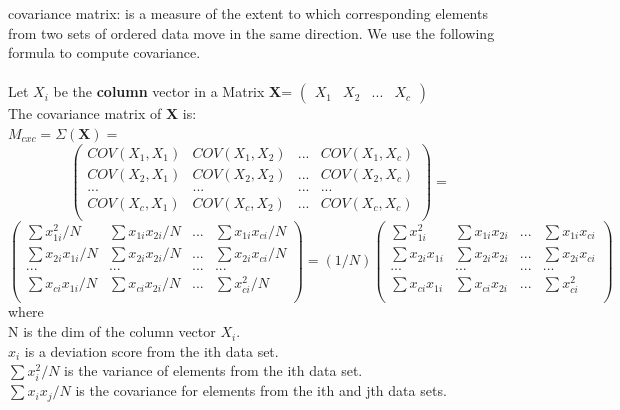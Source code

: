 \documentclass[a4paper,12pt]{article}
\begin{document}
\begin{compactitem}
\item covariance matrix: is a measure of the extent to which corresponding elements from two sets
of ordered data move in the same direction. We use the following formula to compute covariance.
\cite{wiki-covariance}\cite{STAT-covariance}\\
\\Let $X_i$ be the \textbf{column} vector in a Matrix \textbf{X}=
$\begin{pmatrix} X_1 & X_2 &... & X_c \end{pmatrix}$\\
The covariance matrix of \textbf{X} is:\\
$M_{cxc} = \Sigma{(\textbf{X})}=$
\[
\begin{pmatrix}
       COV(X_1,X_1) 	& COV(X_1,X_2) 	& ...	& COV(X_1,X_c)	\\[0.3em]
       COV(X_2,X_1) 	& COV(X_2,X_2) 	& ...	& COV(X_2,X_c)	\\[0.3em]
       ...		& ...			& ...	&	...		\\[0.3em]
       COV(X_c,X_1) 	& COV(X_c,X_2) 	& ...	& COV(X_c,X_c)	\\[0.3em]
\end{pmatrix}
=\]
\begin{equation}
\label{eq:covarm1}
\begin{pmatrix}
       \sum x_{1i}^{2}/N 	& \sum x_{1i} x_{2i}/N 	& ...	& \sum x_{1i} x_{ci}/N	\\[0.3em]
       \sum x_{2i} x_{1i}/N 	& \sum x_{2i} x_{2i}/N 	& ...	& \sum x_{2i} x_{ci}/N	\\[0.3em]
       ...		& ...			& ...	&	...		\\[0.3em]
       \sum x_{ci} x_{1i}/N 	& \sum x_{ci} x_{2i}/N 	& ...	& \sum x_{ci}^{2}/N	\\[0.3em]
\end{pmatrix}
=(1/N)
\begin{pmatrix}
       \sum x_{1i}^{2} 	& \sum x_{1i} x_{2i} 	& ...	& \sum x_{1i} x_{ci}	\\[0.3em]
       \sum x_{2i} x_{1i} 	& \sum x_{2i} x_{2i} 	& ...	& \sum x_{2i} x_{ci}	\\[0.3em]
       ...		& ...			& ...	&	...		\\[0.3em]
       \sum x_{ci} x_{1i} 	& \sum x_{ci} x_{2i} 	& ...	& \sum x_{ci}^{2}	\\[0.3em]
\end{pmatrix}
\end{equation}
where\\
N is the dim of the column vector $X_i$.\\
$x_i$ is a deviation score from the ith data set.\\
$\sum x_i^2 / N$ is the variance of elements from the ith data set.\\
$\sum x_i x_j / N$ is the covariance for elements from the ith and jth data sets.\\


\end{compactitem}
\end{document}

